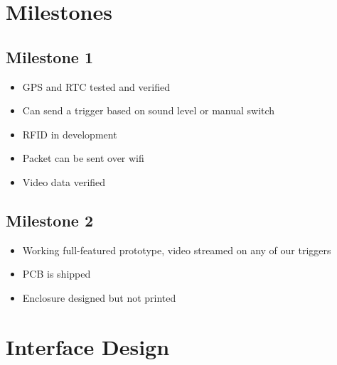 \documentclass[12pt]{article}
\begin{document}
\newpage

\section{Milestones}

\subsection{Milestone 1}
\begin{itemize}
    \item GPS and RTC tested and verified
    \item Can send a trigger based on sound level or manual switch
    \item RFID in development
    \item Packet can be sent over wifi
    \item Video data verified
\end{itemize}

\subsection{Milestone 2}
\begin{itemize}
    \item Working full-featured prototype, video streamed on any of our triggers
    \item PCB is shipped
    \item Enclosure designed but not printed
\end{itemize}

\newpage

\section{Interface Design}
\end{document}
